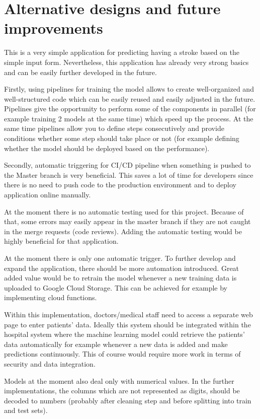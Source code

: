 \section{Alternative designs and future improvements}


This is a very simple application for predicting having a stroke based on the simple input form. Nevertheless, this application has already very strong basics and can be easily further developed in the future. 

Firstly, using pipelines for training the model allows to create well-organized and well-structured code which can be easily reused and easily adjusted in the future. Pipelines give the opportunity to perform some of the components in parallel (for example training 2 models at the same time) which speed up the process. At the same time pipelines allow you to define steps consecutively and provide conditions whether some step should take place or not (for example defining whether the model should be deployed based on the performance).

Secondly, automatic triggering for CI/CD pipeline when something is pushed to the Master branch is very beneficial. This saves a lot of time for developers since there is no need to push code to the production environment and to deploy application online manually.

At the moment there is no automatic testing used for this project. Because of that, some errors may easily appear in the master branch if they are not caught in the merge requests (code reviews). Adding the automatic testing would be highly beneficial for that application.

At the moment there is only one automatic trigger. To further develop and expand the application, there should be more automation introduced. Great added value would be to retrain the model whenever a new training data is uploaded to Google Cloud Storage. This can be achieved for example by implementing cloud functions. \cite{google} 

Within this implementation, doctors/medical staff need to access a separate web page to enter patients’ data. Ideally this system should be integrated within the hospital system where the machine learning model could retrieve the patients’ data automatically for example whenever a new data is added and make predictions continuously. This of course would require more work in terms of security and data integration. 

Models at the moment also deal only with numerical values. In the further implementations, the columns which are not represented as digits, should be decoded to numbers (probably after cleaning step and before splitting into train and test sets).



